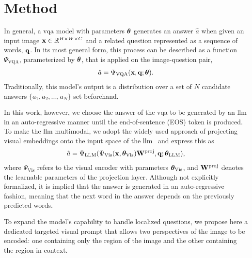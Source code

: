 \section{Method}
\label{sec:locvqallm_method}


In general, a \gls{vqa} model with parameters $\bm{\theta}$ generates an answer $\hat{a}$ when given an input image $\mathbf{x} \in \mathbb{R}^{H\times W\times C}$ and a related question represented as a sequence of words, $\mathbf{q}$. %
In its most general form, this process can be described as a function $\Psi_{\text{VQA}}$, parameterized by $\bm{\theta}$, that is applied on the image-question pair,
\begin{equation}
    \hat{a} = \Psi_{\text{VQA}} (\mathbf{x}, \mathbf{q}; \bm{\theta}).
\end{equation}
Traditionally, this model's output is a distribution over a set of $N$ candidate answers $\{a_1, a_2, ..., a_N\}$ set beforehand. 

In this work, however, we choose the answer of the \gls{vqa} to be generated by an \gls{llm} in an auto-regressive manner until the end-of-sentence (EOS) token is produced. To make the \gls{llm} multimodal, we adopt the widely used approach of projecting visual embeddings onto the input space of the \gls{llm}~\cite{liu2023visual,tsimpoukelli2021multimodal,wang2023r2gengpt} and 
express this as 
\begin{equation}
    \hat{a} = \Psi_{\text{LLM}} (\Psi_{\text{Vis}} (\mathbf{x}, \bm{\theta}_{\text{Vis}})\mathbf{W}^\text{proj}, \mathbf{q}; \bm{\theta}_{\text{LLM}}),
\end{equation}
\noindent
where $\Psi_{\text{Vis}}$ refers to the visual encoder with parameters $\bm{\theta}_{\text{Vis}}$, and $\mathbf{W}^\text{proj}$ denotes the learnable parameters of the projection layer. Although not explicitly formalized, it is implied that the answer is generated in an auto-regressive fashion, meaning that the next word in the answer depends on the previously predicted words.

To expand the model's capability to handle localized questions, we propose here a dedicated targeted visual prompt that allows two perspectives of the image to be encoded: one containing only the region of the image and the other containing the region in context. 

